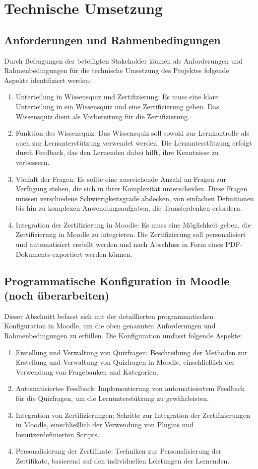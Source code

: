 \chapter{Technische Umsetzung}
\section{Anforderungen und Rahmenbedingungen}
Durch Befragungen der beteiligten Stakeholder können als Anforderungen 
und Rahmenbedingungen für die technische Umsetzung des Projektes 
folgende Aspekte identifiziert werden:
\begin{enumerate}
    \item Unterteilung in Wissensquiz und Zertifizierung: Es muss eine klare Unterteilung in ein Wissensquiz und eine Zertifizierung geben. Das Wissensquiz dient als Vorbereitung für die Zertifizierung.
    \item Funktion des Wissensquiz: Das Wissensquiz soll sowohl zur Lernkontrolle als auch zur Lernunterstützung verwendet werden. Die Lernunterstützung erfolgt durch Feedback, das den Lernenden dabei hilft, ihre Kenntnisse zu verbessern.
    \item Vielfalt der Fragen: Es sollte eine ausreichende Anzahl an Fragen zur Verfügung stehen, die sich in ihrer Komplexität unterscheiden. Diese Fragen müssen verschiedene Schwierigkeitsgrade abdecken, von einfachen Definitionen bis hin zu komplexen Anwendungsaufgaben, die Transferdenken erfordern.    
    \item Integration der Zertifizierung in Moodle: Es muss eine Möglichkeit geben, die Zertifizierung in Moodle zu integrieren. Die Zertifizierung soll personalisiert und automatisiert erstellt werden und nach Abschluss in Form eines PDF-Dokuments exportiert werden können.
\end{enumerate}
\section{Programmatische Konfiguration in Moodle \color{red} (noch überarbeiten)}
Dieser Abschnitt befasst sich mit der detaillierten programmatischen Konfiguration in Moodle, um die oben genannten Anforderungen und Rahmenbedingungen zu erfüllen. Die Konfiguration umfasst folgende Aspekte:
\begin{enumerate}
    \item Erstellung und Verwaltung von Quizfragen: Beschreibung der Methoden zur Erstellung und Verwaltung von Quizfragen in Moodle, einschließlich der Verwendung von Fragebanken und Kategorien.
    \item Automatisiertes Feedback: Implementierung von automatisiertem Feedback für die Quizfragen, um die Lernunterstützung zu gewährleisten.
    \item Integration von Zertifizierungen: Schritte zur Integration der Zertifizierungen in Moodle, einschließlich der Verwendung von Plugins und benutzerdefinierten Scripts.
    \item Personalisierung der Zertifikate: Techniken zur Personalisierung der Zertifikate, basierend auf den individuellen Leistungen der Lernenden.
\end{enumerate}
